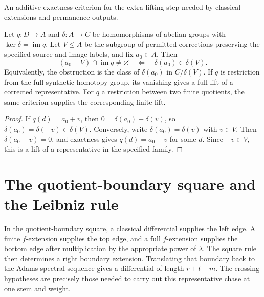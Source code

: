 \begin{proposition}
\label{sem:ProofTools:ml-representative-family-lift}
An additive exactness criterion for the extra lifting step needed by
classical extensions and permanence outputs.\par
Let $q:D\to A$ and $\delta:A\to C$ be homomorphisms of abelian
groups with $\ker\delta=\operatorname{im}q$. Let $V\leq A$ be the
subgroup of permitted corrections preserving the specified source and
image labels, and fix $a_0\in A$. Then
\[
 (a_0+V)\cap\operatorname{im}q\ne\varnothing
 \quad\Longleftrightarrow\quad \delta(a_0)\in\delta(V).
\]
Equivalently, the obstruction is the class of $\delta(a_0)$ in
$C/\delta(V)$. If $q$ is restriction from the full synthetic homotopy
group, its vanishing gives a full lift of a corrected representative. For $q$ a restriction between two finite quotients,
the same criterion supplies the corresponding finite lift.
\end{proposition}
\begin{proof}
If $q(d)=a_0+v$, then $0=\delta(a_0)+\delta(v)$, so
$\delta(a_0)=\delta(-v)\in\delta(V)$. Conversely, write
$\delta(a_0)=\delta(v)$ with $v\in V$. Then
$\delta(a_0-v)=0$, and exactness gives $q(d)=a_0-v$ for some $d$.
Since $-v\in V$, this is a lift of a representative in the specified family.
\end{proof}

\section{The quotient-boundary square and the Leibniz rule}

In the quotient-boundary square, a classical differential supplies the
left edge. A finite $f$-extension supplies the top edge, and a full
$f$-extension supplies the bottom edge after multiplication by the
appropriate power of $\lambda$. The square rule then determines a
right boundary extension. Translating that boundary back to the Adams
spectral sequence gives a differential of length $r+l-m$.
The crossing hypotheses are precisely those needed to carry out this
representative chase at one stem and weight.


